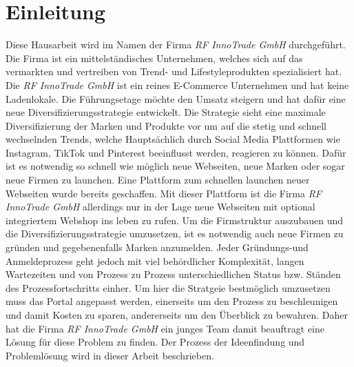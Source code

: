 \newpage

\section{Einleitung} \label{einleitung}
Diese Hausarbeit wird im Namen der Firma \textit{RF InnoTrade GmbH} durchgeführt. Die Firma ist ein mittelständisches Unternehmen, welches sich auf das vermarkten und vertreiben von Trend- und Lifestyleprodukten spezialisiert hat. Die \textit{RF InnoTrade GmbH} ist ein reines E-Commerce Unternehmen und hat keine Ladenlokale. Die Führungsetage möchte den Umsatz steigern und hat dafür eine neue Diversifizierungsstrategie entwickelt. Die Strategie sieht eine maximale Diversifizierung der Marken und Produkte vor um auf die stetig und schnell wechselnden Trends, welche Hauptsächlich durch Social Media Plattformen wie Instagram, TikTok und Pinterest beeinflusst werden, reagieren zu können. Dafür ist es notwendig so schnell wie möglich neue Webseiten, neue Marken oder sogar neue Firmen zu launchen.
Eine Plattform zum schnellen launchen neuer Webseiten wurde bereits geschaffen. Mit dieser Plattform ist die Firma \textit{RF InnoTrade GmbH} allerdings nur in der Lage neue Webseiten mit optional integriertem Webshop ins leben zu rufen. Um die Firmstruktur auszubauen und die Diversifizierungsstrategie umzusetzen, ist es notwendig auch neue Firmen zu gründen und gegebenenfalls Marken anzumelden. Jeder Gründungs-und Anmeldeprozess geht jedoch mit viel behördlicher Komplexität, langen Wartezeiten und von Prozess zu Prozess unterschiedlichen Status bzw. Ständen des Prozessfortschritts einher. Um hier die Stratgeie bestmöglich umzusetzen muss das Portal angepasst werden, einerseits um den Prozess zu beschleunigen und damit Kosten zu sparen, andererseits um den Überblick zu bewahren.
Daher hat die Firma \textit{RF InnoTrade GmbH} ein junges Team damit beauftragt eine Lösung für diese Problem zu finden. Der Prozess der Ideenfindung und Problemlösung wird in dieser Arbeit beschrieben.